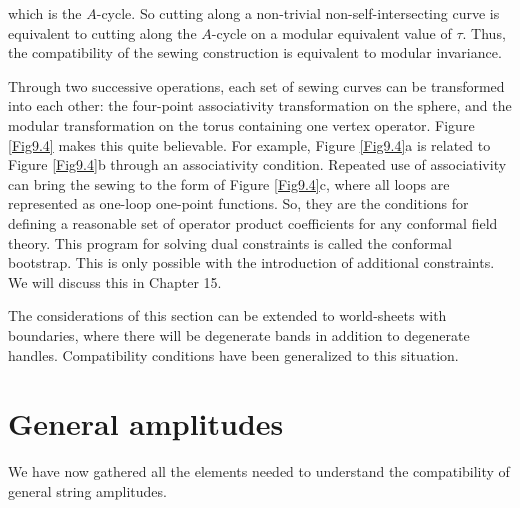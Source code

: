 which is the $A$-cycle.
So cutting along a non-trivial non-self-intersecting curve is equivalent to cutting along the $A$-cycle on a modular equivalent value of $\tau$. Thus, the compatibility of the sewing construction is equivalent to modular invariance.

Through two successive operations, each set of sewing curves can be transformed into each other: the four-point associativity transformation on the sphere, and the modular transformation on the torus containing one vertex operator. Figure \ref{Fig9.4} makes this quite believable. 
For example, Figure \ref{Fig9.4}a is related to Figure \ref{Fig9.4}b through an associativity condition. Repeated use of associativity can bring the sewing to the form of Figure \ref{Fig9.4}c, where all loops are represented as one-loop one-point functions. 
So, they are the conditions for defining a reasonable set of operator product coefficients for any conformal field theory. This program for solving dual constraints is called the conformal bootstrap.
This is only possible with the introduction of additional constraints. We will discuss this in Chapter 15.

The considerations of this section can be extended to world-sheets with boundaries, where there will be degenerate bands in addition to degenerate handles. Compatibility conditions have been generalized to this situation.

\section{General amplitudes}  \label{sec:9.5}
We have now gathered all the elements needed to understand the compatibility of general string amplitudes. 

